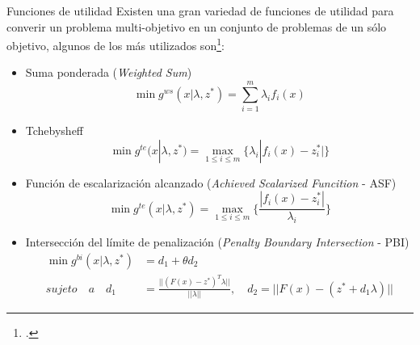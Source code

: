 \documentclass{beamer}
\begin{document}
\begin{frame}{Funciones de utilidad}
Existen una gran variedad de funciones de utilidad para converir un problema multi-objetivo en un conjunto de problemas de un sólo objetivo, algunos de los más utilizados son\footcite{raquel_2018}:
\begin{itemize}
\scriptsize
\item Suma ponderada (\textit{Weighted Sum})
\begin{equation*}
\min_{} g^{ws}(x | \lambda, z^*) = \sum_{i=1}^m \lambda_i f_i(x)     
\end{equation*}
\item Tchebysheff 
\begin{equation*}
    \min_{} g^{te}(x | \lambda, z^*) = \max_{1 \leq i \leq m } \{ \lambda_i | f_i(x) - z_i^* | \}
\end{equation*}{}
\item Función de escalarización alcanzado (\textit{Achieved Scalarized Funcition} - ASF)
\begin{equation*}
    \min_{} g^{te}(x | \lambda, z^*) = \max_{1 \leq i \leq m } \{ \frac{| f_i(x) - z_i^* |}{\lambda_i}\}
\end{equation*}{}
\item Intersección del límite de penalización (\textit{Penalty Boundary Intersection} - PBI)
\begin{equation*}
\begin{split}
    \min g^{bi}(x | \lambda, z^*) &= d_1 + \theta d_2    \\
    sujeto \quad  a \quad d_1 &= \frac{|| (F(x) - z^*)^T \lambda  || }{|| \lambda ||}, \quad d_2 = || F(x) - (z^* + d_1 \lambda )||
\end{split}
\end{equation*}
\end{itemize}
\end{frame}
\end{document}
